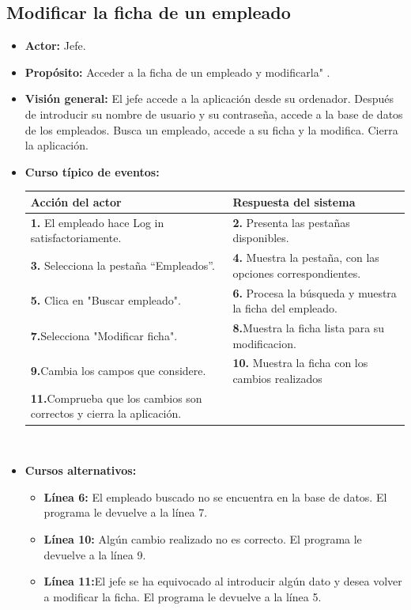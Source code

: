 \documentclass[spanish,a4paper,12pt]{report}	%
\begin{document}

	\subsection{Modificar la ficha de un empleado}		
			\begin{itemize}
			\item \textbf{Actor:} Jefe.
			\item \textbf{Propósito: } Acceder a la ficha de un empleado y modificarla" .
			\item \textbf{Visión general:} El jefe accede a la aplicación desde su ordenador. Después de introducir su nombre de usuario y su contraseña, accede a la base de datos de los empleados. Busca un empleado, accede a su ficha y la modifica. Cierra la aplicación. 
	\newpage
			\item \textbf{Curso típico de eventos:} 	\\
				\begin{tabular}{|p{6cm}||p{6cm}|}
				\hline
				\textbf{Acción del actor} & \textbf{Respuesta del sistema} \\ \hline \hline
				\textbf{1.}   El empleado hace Log in satisfactoriamente. & \textbf{2.} Presenta las pestañas disponibles.\\ \hline
				\textbf{3.} Selecciona la pestaña “Empleados”. & \textbf{4.} Muestra la pestaña, con las opciones correspondientes. \\ \hline
				\textbf{5.} Clica en "Buscar empleado".	& \textbf{6.} Procesa la búsqueda y muestra la ficha del empleado. \\ \hline
				\textbf{7.}Selecciona "Modificar ficha". & \textbf{8.}Muestra la ficha lista para su modificacion.\\ \hline
				\textbf{9.}Cambia los campos que considere. & \textbf{10.} Muestra la ficha con los cambios realizados \\ \hline
				\textbf{11.}Comprueba que los cambios son correctos y cierra la aplicación. & \textbf{} \\ \hline
			\end{tabular}
			\\
			\item \textbf{Cursos alternativos:} 
			\begin{itemize}
			\item  \textbf{Línea 6:} El empleado buscado no se encuentra en la base de datos. El programa le devuelve a la línea 7.
			\item  \textbf{Línea 10:} Algún cambio realizado no es correcto. El programa le devuelve a la línea 9.
			\item  \textbf{Línea 11:}El jefe se ha equivocado al introducir algún dato y desea volver a modificar la ficha. El programa le devuelve a la línea 5.
			
			\end {itemize}
		\end{itemize}%
\end{document}
